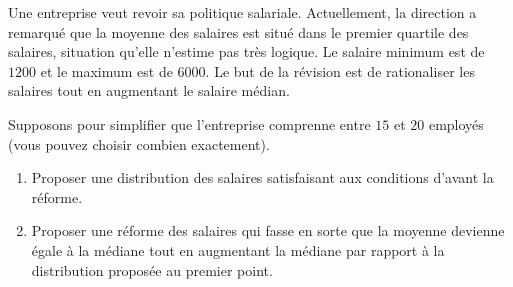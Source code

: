 
\begin{exercice}\label{exosmath-0248}

Une entreprise veut revoir sa politique salariale. Actuellement, la direction a remarqué que la moyenne des salaires est situé dans le premier quartile des salaires, situation qu'elle n'estime pas très logique. Le salaire minimum est de \( 1200\) et le maximum est de \( 6000\). Le but de la révision est de rationaliser les salaires tout en augmentant le salaire médian.

Supposons pour simplifier que l'entreprise comprenne entre \( 15\) et \( 20\) employés (vous pouvez choisir combien exactement).

\begin{enumerate}
    \item
        Proposer une distribution des salaires satisfaisant aux conditions d'avant la réforme.
    \item
        Proposer une réforme des salaires qui fasse en sorte que la moyenne devienne égale à la médiane tout en augmentant la médiane par rapport à la distribution proposée au premier point.
\end{enumerate}

\end{exercice}
